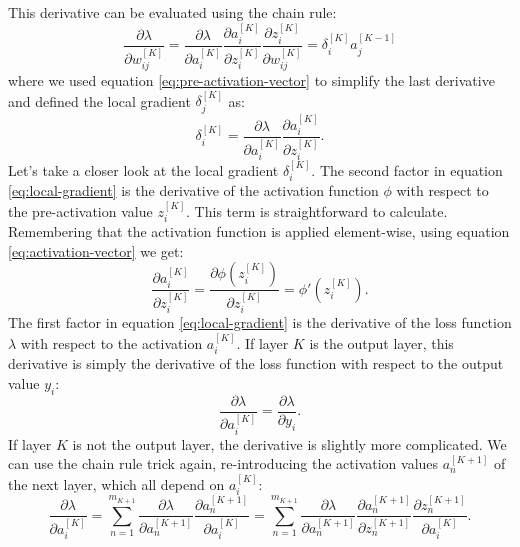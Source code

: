 This derivative can be evaluated using the chain rule:
\begin{equation}
    \frac{\partial \lambda}{\partial w_{ij}^{[K]}} = \frac{\partial \lambda}{\partial a_i^{[K]}} \frac{\partial a_i^{[K]}}{\partial z_i^{[K]}} \frac{\partial z_i^{[K]}}{\partial w_{ij}^{[K]}} = \delta_i^{[K]} a_j^{[K-1]} 
    \label{eq:chain-rule}
\end{equation}
where we used equation \ref{eq:pre-activation-vector} to simplify the last derivative and defined the local gradient $\delta_j^{[K]}$ as:
\begin{equation}
    \delta_i^{[K]} = \frac{\partial \lambda}{\partial a_i^{[K]}} \frac{\partial a_i^{[K]}}{\partial z_i^{[K]}} \text{.}
    \label{eq:local-gradient}
\end{equation}
Let's take a closer look at the local gradient $\delta_i^{[K]}$.
The second factor in equation \ref{eq:local-gradient} is the derivative of the activation function $\phi$ with respect to the pre-activation value $z_i^{[K]}$.
This term is straightforward to calculate.
Remembering that the activation function is applied element-wise, using equation \ref{eq:activation-vector} we get:
\begin{equation}
    \frac{\partial a_i^{[K]}}{\partial z_i^{[K]}} = \frac{\partial \phi(z_i^{[K]})}{\partial z_i^{[K]}} = \phi'(z_i^{[K]}) \text{.}
    \label{eq:activation-derivative}
\end{equation}
The first factor in equation \ref{eq:local-gradient} is the derivative of the loss function $\lambda$ with respect to the activation $a_i^{[K]}$.
If layer $K$ is the output layer, this derivative is simply the derivative of the loss function with respect to the output value $y_i$:
\begin{equation}
    \frac{\partial \lambda}{\partial a_i^{[K]}} = \frac{\partial \lambda}{\partial y_i} \text{.}
    \label{eq:loss-derivative-output}
\end{equation}
If layer $K$ is not the output layer, the derivative is slightly more complicated.
We can use the chain rule trick again, re-introducing the activation values $a_n^{[K+1]}$ of the next layer, which all depend on $a_i^{[K]}$:
\begin{equation}
    \frac{\partial \lambda}{\partial a_i^{[K]}} = \sum_{n=1}^{m_{K+1}} \frac{\partial \lambda}{\partial a_n^{[K+1]}} \frac{\partial a_n^{[K+1]}}{\partial a_i^{[K]}} = \sum_{n=1}^{m_{K+1}} \frac{\partial \lambda}{\partial a_n^{[K+1]}} \frac{\partial a_n^{[K+1]}}{\partial z_n^{[K+1]}} \frac{\partial z_n^{[K+1]}}{\partial a_i^{[K]}} \text{.}
    \label{eq:loss-derivative-hidden}
\end{equation}
